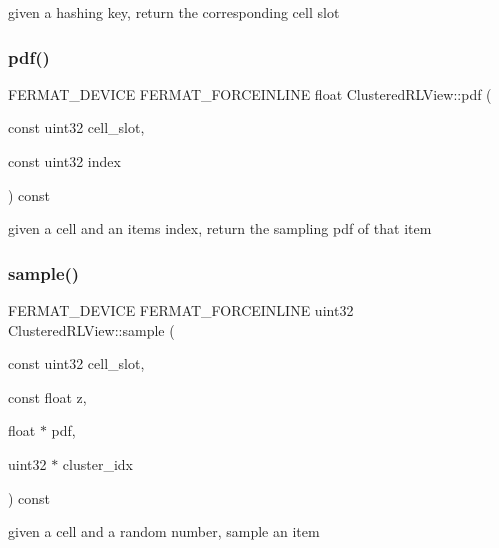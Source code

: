 given a hashing key, return the corresponding cell slot \mbox{\label{struct_clustered_r_l_view_ad2f4d9df7d5b7278462e1f0dbf2386e3}} 
\subsubsection{\texorpdfstring{pdf()}{pdf()}}
{\footnotesize\ttfamily F\+E\+R\+M\+A\+T\+\_\+\+D\+E\+V\+I\+CE F\+E\+R\+M\+A\+T\+\_\+\+F\+O\+R\+C\+E\+I\+N\+L\+I\+NE float Clustered\+R\+L\+View\+::pdf (\begin{DoxyParamCaption}\item[{const uint32}]{cell\+\_\+slot,  }\item[{const uint32}]{index }\end{DoxyParamCaption}) const}

given a cell and an item\textquotesingle{}s index, return the sampling pdf of that item \mbox{\label{struct_clustered_r_l_view_a72030c277568b5f0ee9476ce520e1096}} 
\subsubsection{\texorpdfstring{sample()}{sample()}}
{\footnotesize\ttfamily F\+E\+R\+M\+A\+T\+\_\+\+D\+E\+V\+I\+CE F\+E\+R\+M\+A\+T\+\_\+\+F\+O\+R\+C\+E\+I\+N\+L\+I\+NE uint32 Clustered\+R\+L\+View\+::sample (\begin{DoxyParamCaption}\item[{const uint32}]{cell\+\_\+slot,  }\item[{const float}]{z,  }\item[{float $\ast$}]{pdf,  }\item[{uint32 $\ast$}]{cluster\+\_\+idx }\end{DoxyParamCaption}) const}

given a cell and a random number, sample an item \mbox{\label{struct_clustered_r_l_view_a007fd0458e4dd173adf57dec5f4db9e2}} 
